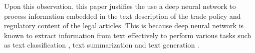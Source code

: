 Upon this observation, this paper justifies the use a deep neural network to process information embedded in the text description of the trade policy and regulatory content of the legal articles. This is because deep neural network is known to 
extract information from text effectively to perform various tasks such as text classification \citep{minaee2020deep}, text summarization \citep{textsum} and text generation \citep{guo2017long}.




